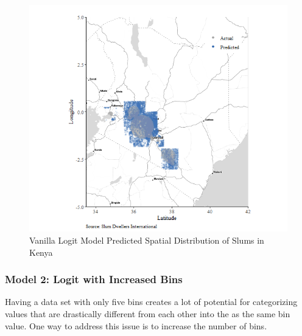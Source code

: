 \begin{figure}
    \centering
    \includegraphics[scale = 0.7]{Graphics/Vanilla Predicted Spatial Distribution of Slums in Kenya.png}
    \caption{Vanilla Logit Model Predicted Spatial Distribution of Slums in Kenya}
    \label{fig:vanillaPredict}
\end{figure}

\subsubsection{Model 2: Logit with Increased Bins}

Having a data set with only five bins creates a lot of potential for categorizing values that are drastically different from each other into the as the same bin value. One way to address this issue is to increase the number of bins. 

